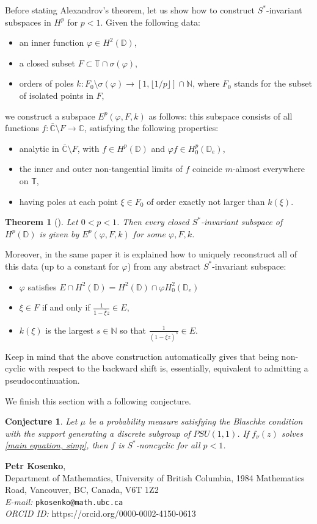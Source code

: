 \documentclass[11pt]{article}
\makeatletter
\newtheorem{theorem}{Theorem}[section]
\newtheorem{conjecture}{Conjecture}[section]
\newcommand{\Addresses}{{%
		\bigskip
		\footnotesize
		\noindent
		\textbf{Petr Kosenko}, \\
		Department of Mathematics, University of British Columbia, 1984 Mathematics Road, Vancouver, BC, Canada, V6T 1Z2 \\	
		\textit{E-mail:} \texttt{pkosenko@math.ubc.ca} \\
		\textit{ORCID ID:} https://orcid.org/0000-0002-4150-0613
}}
\makeatother
\begin{document}
\begin{itemize}
	Before stating Alexandrov's theorem, let us show how to construct $S^*$-invariant subspaces in $H^p$ for $p < 1$. Given the following data:
	\begin{itemize}
		\item an inner function $\varphi \in H^2(\mathbb{D})$,
		\item a closed subset $F \subset \mathbb{T} \cap \sigma(\varphi)$,
		\item orders of poles $k : F_0 \setminus \sigma(\varphi) \rightarrow [1, \lfloor 1 / p \rfloor ] \cap \mathbb{N}$, where $F_0$ stands for the subset of isolated points in $F$,
	\end{itemize}
	we construct a subspace $E^p(\varphi, F, k)$ as follows: this subspace consists of all functions $f : \overline{\mathbb{C}} \setminus F \rightarrow \mathbb{C}$, satisfying the following properties:
	\begin{itemize}
		\item analytic in $\overline{\mathbb{C}} \setminus F$, with $f \in H^p(\mathbb{D})$ and $\varphi f \in H^p_0(\mathbb{D}_e)$,
		\item the inner and outer non-tangential limits of $f$ coincide $m$-almost everywhere on $\mathbb{T}$,
		\item having poles at each point $\xi \in F_0$ of order exactly not larger than $k(\xi)$.
	\end{itemize}
	
	\begin{theorem}[\cite{Ale79}]
		Let $0 < p < 1$. Then every closed $S^*$-invariant subspace of $H^p(\mathbb{D})$ is given by $E^p(\varphi, F, k)$ for some $\varphi, F, k$.
	\end{theorem}
	Moreover, in the same paper it is explained how to uniquely reconstruct all of this data (up to a constant for $\varphi$) from any abstract $S^*$-invariant subspace:
	\begin{itemize}
		\item $\varphi$ satisfies $E \cap H^2(\mathbb{D}) = H^2(\mathbb{D}) \cap \varphi H^2_0(\mathbb{D}_e)$
		\item $\xi \in F$ if and only if $\frac{1}{1 - \overline{\xi} z} \in E$,
		\item $k(\xi)$ is the largest $s \in \mathbb{N}$ so that $\frac{1}{(1 - \overline{\xi} z)^s} \in E$.
	\end{itemize}
	
	Keep in mind that the above construction automatically gives that being non-cyclic with respect to the backward shift is, essentially, equivalent to admitting a pseudocontinuation.
	
	We finish this section with a following conjecture.
	
	\begin{conjecture}
		Let $\mu$ be a probability measure satisfying the Blaschke condition with the support generating a discrete subgroup of $PSU(1,1)$. If $f_\nu(z)$ solves \eqref{main equation, simp}, then $f$ is $S^*$-noncyclic for all $p < 1$.
	\end{conjecture}
\end{itemize}

\printbibliography
\Addresses
\end{document}
